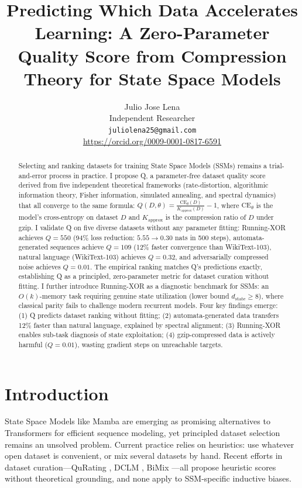 \documentclass{article}
\title{Predicting Which Data Accelerates Learning: A Zero-Parameter Quality Score from Compression Theory for State Space Models}
\author{
  Julio Jose Lena \\
  Independent Researcher \\
  \texttt{juliolena25@gmail.com} \\
  \url{https://orcid.org/0009-0001-0817-6591}
}
\begin{document}
\maketitle

\begin{abstract}
Selecting and ranking datasets for training State Space Models (SSMs) remains a trial-and-error process in practice. I propose Q, a parameter-free dataset quality score derived from five independent theoretical frameworks (rate-distortion, algorithmic information theory, Fisher information, simulated annealing, and spectral dynamics) that all converge to the same formula: $Q(D, \theta) = \frac{\mathrm{CE}_\theta(D)}{K_{\mathrm{approx}}(D)} - 1$, where $\mathrm{CE}_\theta$ is the model's cross-entropy on dataset $D$ and $K_{\mathrm{approx}}$ is the compression ratio of $D$ under gzip. I validate Q on five diverse datasets without any parameter fitting: Running-XOR achieves $Q = 550$ (94\% loss reduction: $5.55 \to 0.30$ nats in 500 steps), automata-generated sequences achieve $Q = 109$ (12\% faster convergence than WikiText-103), natural language (WikiText-103) achieves $Q = 0.32$, and adversarially compressed noise achieves $Q = 0.01$. The empirical ranking matches Q's predictions exactly, establishing Q as a principled, zero-parameter metric for dataset curation without fitting. I further introduce Running-XOR as a diagnostic benchmark for SSMs: an $O(k)$-memory task requiring genuine state utilization (lower bound $d_{\mathrm{state}} \geq 8$), where classical parity fails to challenge modern recurrent models. Four key findings emerge: (1) Q predicts dataset ranking without fitting; (2) automata-generated data transfers 12\% faster than natural language, explained by spectral alignment; (3) Running-XOR enables sub-task diagnosis of state exploitation; (4) gzip-compressed data is actively harmful ($Q = 0.01$), wasting gradient steps on unreachable targets.
\end{abstract}

\section{Introduction}

State Space Models like Mamba \citep{gu2024mamba} are emerging as promising alternatives to Transformers for efficient sequence modeling, yet principled dataset selection remains an unsolved problem. Current practice relies on heuristics: use whatever open dataset is convenient, or mix several datasets by hand. Recent efforts in dataset curation---QuRating \citep{qurating2024}, DCLM \citep{dclm2024}, BiMix \citep{bimix2025}---all propose heuristic scores without theoretical grounding, and none apply to SSM-specific inductive biases.
\end{document}
